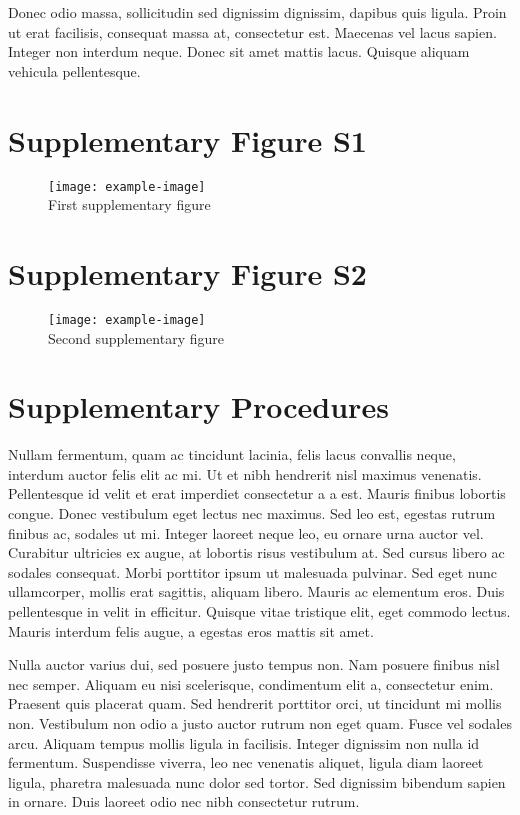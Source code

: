 Donec odio massa, sollicitudin sed dignissim dignissim, dapibus quis ligula. Proin ut erat facilisis, consequat massa at, consectetur est. Maecenas vel lacus sapien. Integer non interdum neque. Donec sit amet mattis lacus. Quisque aliquam vehicula pellentesque.

\section*{Supplementary Figure S1}

\begin{figure}[!ht]
\centering
\texttt{[image: example-image]}
\\ First supplementary figure
\end{figure}

\section*{Supplementary Figure S2}

\begin{figure}[!ht]
\centering
\texttt{[image: example-image]}
\\ Second supplementary figure
\end{figure}


\section*{Supplementary Procedures}

Nullam fermentum, quam ac tincidunt lacinia, felis lacus convallis neque, interdum auctor felis elit ac mi. Ut et nibh hendrerit nisl maximus venenatis. Pellentesque id velit et erat imperdiet consectetur a a est. Mauris finibus lobortis congue. Donec vestibulum eget lectus nec maximus. Sed leo est, egestas rutrum finibus ac, sodales ut mi. Integer laoreet neque leo, eu ornare urna auctor vel. Curabitur ultricies ex augue, at lobortis risus vestibulum at. Sed cursus libero ac sodales consequat. Morbi porttitor ipsum ut malesuada pulvinar. Sed eget nunc ullamcorper, mollis erat sagittis, aliquam libero. Mauris ac elementum eros. Duis pellentesque in velit in efficitur. Quisque vitae tristique elit, eget commodo lectus. Mauris interdum felis augue, a egestas eros mattis sit amet.

Nulla auctor varius dui, sed posuere justo tempus non. Nam posuere finibus nisl nec semper. Aliquam eu nisi scelerisque, condimentum elit a, consectetur enim. Praesent quis placerat quam. Sed hendrerit porttitor orci, ut tincidunt mi mollis non. Vestibulum non odio a justo auctor rutrum non eget quam. Fusce vel sodales arcu. Aliquam tempus mollis ligula in facilisis. Integer dignissim non nulla id fermentum. Suspendisse viverra, leo nec venenatis aliquet, ligula diam laoreet ligula, pharetra malesuada nunc dolor sed tortor. Sed dignissim bibendum sapien in ornare. Duis laoreet odio nec nibh consectetur rutrum.

